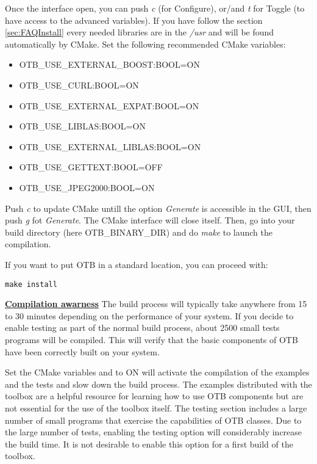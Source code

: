 Once the interface open, you can push \emph{c} (for Configure), or/and \emph{t} for Toggle (to have access to the advanced variables). If you have follow the section \ref{sec:FAQInstall} every needed libraries are in the
\emph{/usr} and will be found automatically by CMake. Set the following recommended CMake variables:
\begin{itemize}
\item OTB\_USE\_EXTERNAL\_BOOST:BOOL=ON
\item OTB\_USE\_CURL:BOOL=ON
\item OTB\_USE\_EXTERNAL\_EXPAT:BOOL=ON
\item OTB\_USE\_LIBLAS:BOOL=ON
\item OTB\_USE\_EXTERNAL\_LIBLAS:BOOL=ON
\item OTB\_USE\_GETTEXT:BOOL=OFF
\item OTB\_USE\_JPEG2000:BOOL=ON
\end{itemize}

Push \emph{c} to update CMake untill the option \emph{Generate} is accessible in the GUI,
then push \emph{g} fot \emph{Generate}. The CMake interface will close itself.
Then, go into your build directory (here OTB\_BINARY\_DIR) and do \emph{make} to launch the compilation.

If you want to put OTB in a standard location, you can proceed with:

\begin{verbatim}
make install
\end{verbatim}

\textbf{\underline{Compilation awarness}}
The build process will typically take anywhere from 15 to 30 minutes depending
on the performance of your system. If you decide to enable testing as part of
the normal build process, about 2500 small tests programs will be compiled. This
will verify that the basic components of OTB have been correctly built on your
system.

Set the CMake variables  and  to ON will activate
the compilation of the examples and the tests and slow down the build process.
The examples distributed with the toolbox are a helpful resource for learning how to use OTB
components but are not essential for the use of the toolbox itself. The testing
section includes a large number of small programs that exercise the
capabilities of OTB classes. Due to the large number of tests, enabling the
testing option will considerably increase the build time.  It is not
desirable to enable this option for a first build of the toolbox.

